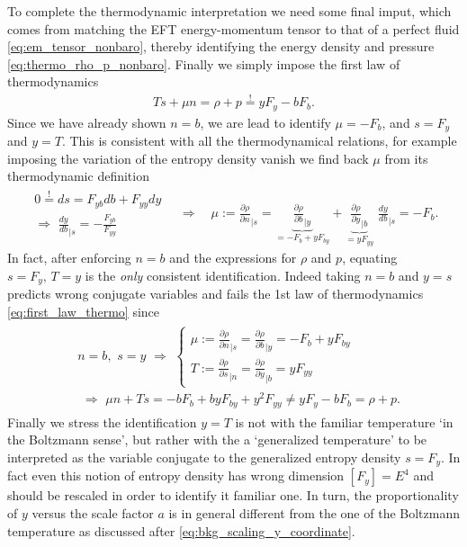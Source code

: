 To complete the thermodynamic interpretation we need some final imput, which comes from matching the EFT energy-momentum tensor to that of a perfect fluid \eqref{eq:em_tensor_nonbaro}, thereby identifying the energy density and pressure \eqref{eq:thermo_rho_p_nonbaro}.
Finally we simply impose the first law of thermodynamics
\begin{align}\label{eq:first_law_thermo}
    T s+ \mu n = \rho+p \overset{!}{=} yF_y-bF_b.
\end{align}
Since we have already shown $n=b$, we are lead to identify $\mu=-F_b$, and $s=F_y$ and $y=T$.
This is consistent with all the thermodynamical relations, for example imposing the variation of the entropy density vanish we find back $\mu$ from its thermodynamic definition
\begin{align}\label{eq:chemical_potential_and_entropy_consistency}
    \begin{array}{c}
     0\overset{!}{=}ds = F_{yb} db + F_{yy}dy\\[3pt]
    \displaystyle\Rightarrow\,\, \frac{dy}{db}_{|s}=-\frac{F_{yb}}{F_{yy}}
    \end{array}
    \quad\Rightarrow\quad \mu:=\frac{\partial\rho}{\partial n}_{|s}= \underbrace{\frac{\partial\rho}{\partial b}_{|y}}_{=-F_b+yF_{by}}+ \underbrace{\frac{\partial\rho}{\partial y}_{|b}}_{=yF_{yy}}\,\,\frac{dy}{db}_{|s}=-F_b.
\end{align}
In fact, after enforcing $n=b$ and the expressions for $\rho$ and $p$, equating $s=F_y,\,T=y$ is the \emph{only} consistent identification.
Indeed taking $n=b$ and $y=s$ predicts wrong conjugate variables and fails the 1st law of thermodynamics \eqref{eq:first_law_thermo} since
\begin{align}\begin{aligned}
    &n=b,\,\,s= y \,\,\Rightarrow\,\, \begin{cases}
        \mu:=\frac{\partial\rho}{\partial n}_{|s}= \frac{\partial\rho}{\partial b}_{|y}=-F_b+yF_{by}\\
         T:=\frac{\partial\rho}{\partial s}_{|n}= \frac{\partial\rho}{\partial y}_{|b}=yF_{yy}
    \end{cases}\\[4pt]
    &\,\,\Rightarrow\,\, \mu n +T s= -bF_b+byF_{by}+y^2F_{yy}\neq yF_y-bF_b=\rho+p.
\end{aligned}\end{align}
Finally we stress the identification $y=T$ is not with the familiar temperature `in the Boltzmann sense', but rather with the a `generalized temperature' to be interpreted as the variable conjugate to the generalized entropy density $s=F_y$.
In fact even this notion of entropy density has wrong dimension $[F_y]=E^4$ and should be rescaled in order to identify it familiar one.
In turn, the proportionality of $y$ versus the scale factor $a$ is in general different from the one of the Boltzmann temperature as discussed after \eqref{eq:bkg_scaling_y_coordinate}.


